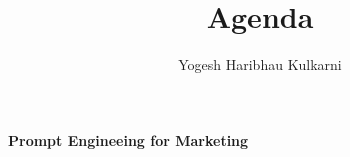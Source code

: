 \documentclass[a4paper, 11pt]{article}
\title{Agenda}
\author{Yogesh Haribhau Kulkarni}
\begin{document}
\pagestyle{style2}



\makebox[\linewidth]{\rule{\linewidth}{1pt}}
\begin{center} 
\textbf{\Large Prompt Engineeing for Marketing}
\end{center}
\makebox[\linewidth]{\rule{\linewidth}{1pt}}

%
\end{document}
